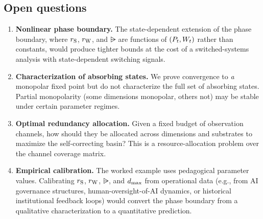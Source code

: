 \subsection{Open questions}

\begin{enumerate}
\item \textbf{Nonlinear phase boundary.}  The state-dependent extension
  of the phase boundary, where $r_{\mathrm{S}}$, $r_{\mathrm{W}}$, and $\rsub$ are functions
  of $(P_t, W_t)$ rather than constants, would produce tighter bounds
  at the cost of a switched-systems analysis with state-dependent
  switching signals.

\item \textbf{Characterization of absorbing states.}  We prove
  convergence to \emph{a} monopolar fixed point but do not characterize
  the full set of absorbing states.  Partial monopolarity (some
  dimensions monopolar, others not) may be stable under certain
  parameter regimes.

\item \textbf{Optimal redundancy allocation.}  Given a fixed budget of
  observation channels, how should they be allocated across dimensions
  and substrates to maximize the self-correcting basin?  This is a
  resource-allocation problem over the channel coverage matrix.

\item \textbf{Empirical calibration.}  The worked example uses
  pedagogical parameter values.  Calibrating $r_{\mathrm{S}}$, $r_{\mathrm{W}}$, $\rsub$,
  and $d_{\mathrm{max}}$ from operational data (e.g., from AI governance
  structures, human-oversight-of-AI dynamics, or historical
  institutional feedback loops) would convert the phase boundary from
  a qualitative characterization to a quantitative prediction.
\end{enumerate}
